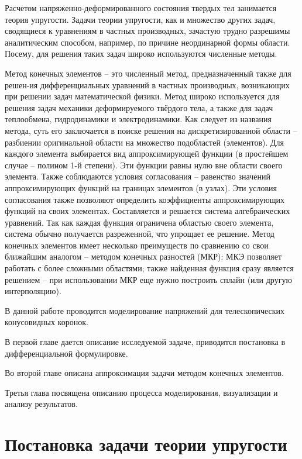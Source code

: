 \documentclass[a4paper, 14pt]{extreport}
\begin{document}
Расчетом напряженно-деформированного состояния 
твердых тел занимается теория упругости. Задачи теории
упругости, как и множество других задач, сводящиеся к
уравнениям в частных производных, зачастую трудно 
разрешимы аналитическим способом, например, по причине
неординарной формы области. Посему, для решения таких
задач широко используются численные методы.

Метод конечных элементов \cite{finite_element_method} -- это численный метод, 
предназначенный также для решен-ия 
дифференциальных уравнений в частных производных, 
возникающих при решении задач математической физики. 
Метод широко используется для решения задач механики 
деформируемого твёрдого тела, а также для задач теплообмена, 
гидродинамики и электродинамики.
Как следует из названия метода, суть его заключается в поиске 
решения на дискретизированной области -- разбиении 
оригинальной области на множество подобластей (элементов).
Для каждого элемента выбирается вид аппроксимирующей
функции (в простейшем случае -- полином 1-й степени).
Эти функции равны нулю вне области своего элемента.
Также соблюдаются условия согласования -- равенство
значений  аппроксимирующих функций на границах элементов
 (в узлах). 
Эти условия согласования также позволяют определить 
коэффициенты аппроксимирующих функций на своих элементах.
Составляется и решается система алгебраических уравнений.
Так как каждая функция ограничена областью своего элемента, 
система обычно получается разреженной, что упрощает ее 
решение.
Метод конечных элементов имеет несколько преимуществ 
по сравнению со свои ближайшим аналогом -- методом 
конечных разностей (МКР): МКЭ позволяет работать с более 
сложными областями; также найденная функция сразу является 
решением -- при использовании МКР еще нужно построить
сплайн (или другую интерполяцию).

В данной работе проводится моделирование напряжений 
для телескопических конусовидных коронок.

В первой главе дается описание исследуемой задаче, 
приводится постановка в дифференциальной формулировке.

Во второй главе описана аппроксимация задачи методом
конечных элементов.

Третья глава посвящена описанию процесса моделирования, 
визуализации и анализу результатов.


\chapter{Постановка задачи теории упругости}
\end{document}
